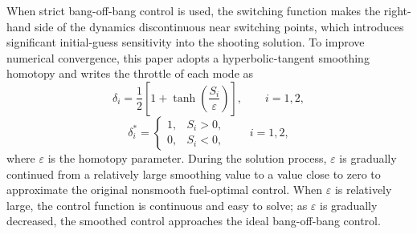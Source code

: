 ﻿\documentclass{IEEEtaes}
\begin{document}
When strict bang-off-bang control is used, the switching function makes the right-hand side of the dynamics discontinuous near switching points, which introduces significant initial-guess sensitivity into the shooting solution. To improve numerical convergence, this paper adopts a hyperbolic-tangent smoothing homotopy and writes the throttle of each mode as
\begin{equation}
\delta_i=\frac{1}{2}\left[1+\tanh\left(\frac{S_i}{\varepsilon}\right)\right],\qquad i=1,2,
\end{equation}
\begin{equation}
\delta_i^{*}=\begin{cases}
1, & S_i>0,\\
0, & S_i<0,
\end{cases}\qquad i=1,2,
\end{equation}
where $\varepsilon$ is the homotopy parameter. During the solution process, $\varepsilon$ is gradually continued from a relatively large smoothing value to a value close to zero to approximate the original nonsmooth fuel-optimal control. When $\varepsilon$ is relatively large, the control function is continuous and easy to solve; as $\varepsilon$ is gradually decreased, the smoothed control approaches the ideal bang-off-bang control.
\end{document}
